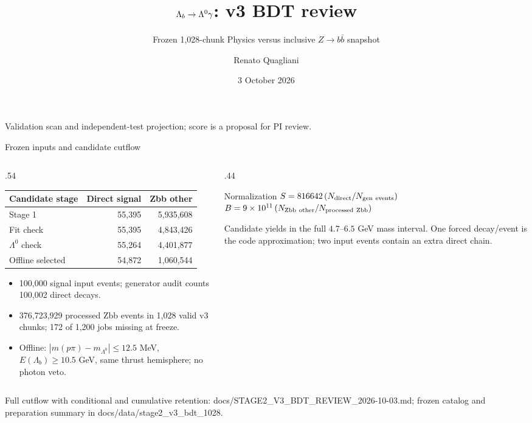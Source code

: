 \documentclass[aspectratio=169,10pt]{beamer}
\title{\texorpdfstring{$\Lb\to\Lz\gamma$}{Lb to Lambda gamma}: v3 BDT review}
\subtitle{Frozen 1,028-chunk Physics versus inclusive $Z\to b\bar b$ snapshot}
\author{Renato Quagliani}
\institute{FCC-ee analysis review}
\date{3 October 2026}
\newcommand{\Lb}{\Lambda_b}
\newcommand{\Lz}{\Lambda^0}
\newcommand{\smallsource}[1]{\vfill{\tiny\color{gray}#1}}
\begin{document}
\begin{frame}
\titlepage
\begin{center}\small Validation scan and independent-test projection; score is a proposal for PI review.\end{center}
\end{frame}

\begin{frame}{Frozen inputs and candidate cutflow}
\begin{columns}[T]
\begin{column}{.54\textwidth}
\small
\begin{tabular}{lrr}
\toprule
Candidate stage & Direct signal & Zbb other\\
\midrule
Stage 1 & 55,395 & 5,935,608\\
Fit check & 55,395 & 4,843,426\\
$\Lz$ check & 55,264 & 4,401,877\\
Offline selected & 54,872 & 1,060,544\\
\bottomrule
\end{tabular}
\vspace{.4cm}

\begin{itemize}
\item 100,000 signal input events; generator audit counts 100,002 direct decays.
\item 376,723,929 processed Zbb events in 1,028 valid v3 chunks; 172 of 1,200 jobs missing at freeze.
\item Offline: $|m(p\pi)-m_{\Lz}|\leq12.5$ MeV, $E(\Lb)\geq10.5$ GeV, same thrust hemisphere; no photon veto.
\end{itemize}
\end{column}
\begin{column}{.44\textwidth}
\begin{block}{Normalization}
\small $S=816642\,(N_{\rm direct}/N_{\rm gen\ events})$\\[.15cm]
$B=9\times10^{11}\,(N_{\rm Zbb\ other}/N_{\rm processed\ Zbb})$
\end{block}
\small Candidate yields in the full $4.7$--$6.5$ GeV mass interval. One forced decay/event is the code approximation; two input events contain an extra direct chain.
\end{column}
\end{columns}
\smallsource{Full cutflow with conditional and cumulative retention: docs/STAGE2\_V3\_BDT\_REVIEW\_2026-10-03.md; frozen catalog and preparation summary in docs/data/stage2\_v3\_bdt\_1028.}
\end{frame}
\end{document}
